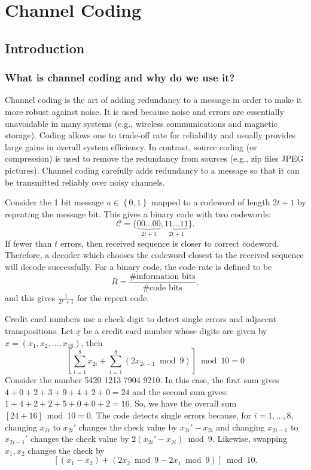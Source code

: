 \chapter{Channel Coding}

\section{Introduction}

\subsection{What is channel coding and why do we use it?}

Channel coding is the art of adding redundancy to a message in order to make it more robust against noise.
It is used because noise and errors are essentially unavoidable in many systems (e.g., wireless communications and magnetic storage).
Coding allows one to trade-off rate for reliability and usually provides large gains in overall system efficiency.
In contrast, source coding (or compression) is used to remove the redundancy from sources (e.g., zip files JPEG pictures).
Channel coding carefully adds redundancy to a message so that it can be transmitted reliably over noisy channels. 

\begin{example}
Consider the 1 bit message $u\in\left\{ 0,1\right\} $ mapped to a codeword of length $2t+1$ by repeating the message bit.
This gives a binary code with two codewords:
\[ \mathcal{C}=\{\underbrace{00\ldots00}_{2t+1},\underbrace{11\ldots11}_{2t+1}\}. \]
If fewer than $t$ errors, then received sequence is closer to correct codeword.
Therefore, a decoder which chooses the codeword closest to the received sequence will decode successfully.
For a binary code, the code rate is defined to be
\[R=\frac{\mbox{\# information bits}}{\mbox{\# code bits}},\]
and this gives $\frac{1}{2t+1}$ for the repeat code.
\end{example}


\begin{example}
Credit card numbers use a check digit to detect single errors and adjacent transpositions.
Let $\underline{x}$ be a credit card number whose digits are given by $\underline{x}=\left(x_{1},x_{2},\ldots,x_{16}\right)$,
then
\[ \left[\sum_{i=1}^{8}x_{2i}+\sum_{i=1}^{8}\left(2x_{2i-1}\bmod9\right)\right]\bmod10=0\]
Consider the number 5420 1213 7904 9210.
In this case, the first sum gives $4+0+2+3+9+4+2+0=24$ and the second sum gives: $1+4+2+2+5+0+0+2=16$.
So, we have the overall sum $\left[24+16\right]\bmod10=0$.
The code detects single errors because, for $i=1,\ldots,8$, changing $x_{2i}$ to $x_{2i}'$ changes the check value by $x_{2i}'-x_{2i}$ and changing $x_{2i-1}$ to $x_{2i-1}'$ changes the check value by $2(x_{2i}'-x_{2i})\bmod 9$.
Likewise,  swapping $x_{1},x_{2}$ changes the check by
\[ \left[(x_{1}-x_{2})+(2x_{2}\bmod9-2x_{1}\bmod9)\right]\bmod10. \]
\end{example}

